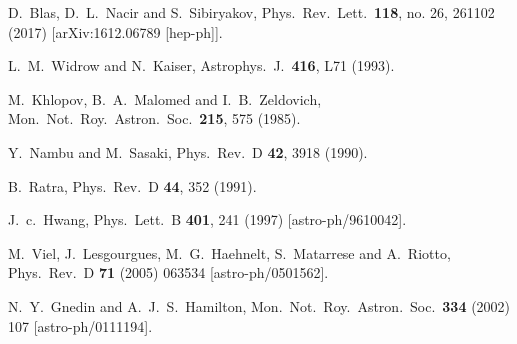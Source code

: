 \documentclass[11pt,nofootinbib]{article}
\numberwithin{equation}{section}
\begin{document}
\begin{thebibliography}{99}
  D.~Blas, D.~L.~Nacir and S.~Sibiryakov,
  Phys.\ Rev.\ Lett.\  {\bf 118}, no. 26, 261102 (2017)
  [arXiv:1612.06789 [hep-ph]].

  L.~M.~Widrow and N.~Kaiser,
  Astrophys.\ J.\  {\bf 416}, L71 (1993).	

  M.~Khlopov, B.~A.~Malomed and I.~B.~Zeldovich,
  Mon.\ Not.\ Roy.\ Astron.\ Soc.\  {\bf 215}, 575 (1985).

  Y.~Nambu and M.~Sasaki,
  Phys.\ Rev.\ D {\bf 42}, 3918 (1990).

  B.~Ratra,
  Phys.\ Rev.\ D {\bf 44}, 352 (1991).

  J.~c.~Hwang,
  Phys.\ Lett.\ B {\bf 401}, 241 (1997)
  [astro-ph/9610042].
	
  M.~Viel, J.~Lesgourgues, M.~G.~Haehnelt, S.~Matarrese and A.~Riotto,
  Phys.\ Rev.\ D {\bf 71} (2005) 063534
  [astro-ph/0501562].  

  N.~Y.~Gnedin and A.~J.~S.~Hamilton,
  Mon.\ Not.\ Roy.\ Astron.\ Soc.\  {\bf 334} (2002) 107
  [astro-ph/0111194].  
  
\end{thebibliography}
\end{document}

